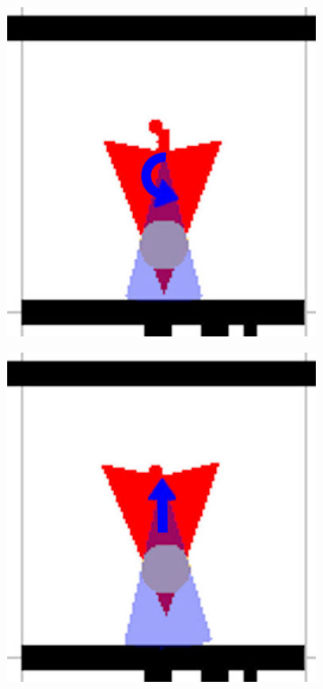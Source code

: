 \documentclass[eind]{penoverslag}
\begin{document}
\begin{figure}
\begin{subfigure}[hb]{0.2\textwidth}
        \end{subfigure}%
        \begin{subfigure}[hb]{0.2\textwidth}
                \centering
                \includegraphics[width=\textwidth]{muur4}
        \end{subfigure}%
        \begin{subfigure}[hb]{0.2\textwidth}
                \centering
                \includegraphics[width=\textwidth]{muur5}

\end{subfigure}
\end{figure}
\end{document}
